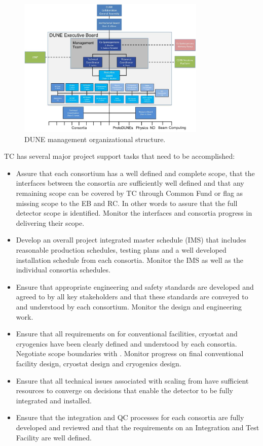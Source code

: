 \begin{figure}[htb]
  \begin{center}
    \includegraphics[width=0.8\textwidth]{far-detector-generic/figures/DUNE_mgmt}
    \caption{DUNE management organizational structure.}
    \label{fig:DUNE_org}
  \end{center}
\end{figure}



TC has several major project support tasks that need to be accomplished:
\begin{itemize}
  \item Assure that each consortium has a well defined and complete
    scope, that the interfaces between the consortia are sufficiently
    well defined and that any remaining scope can be covered by TC
    through Common Fund or flag as missing scope to the EB and RC. In
    other words to assure that the full detector scope is
    identified. Monitor the interfaces and consortia progress in
    delivering their scope.
  \item Develop an overall project integrated master schedule (IMS)
    that includes reasonable production schedules, testing plans and a
    well developed installation schedule from each consortia. Monitor
    the IMS as well as the individual consortia schedules.
  \item Ensure that appropriate engineering and safety standards are
    developed and agreed to by all key stakeholders and that these
    standards are conveyed to and understood by each
    consortium. Monitor the design and engineering work.
  \item Ensure that all  requirements on  for
    conventional facilities, cryostat and cryogenics have been clearly
    defined and understood by each consortia. Negotiate scope
    boundaries with . Monitor  progress on
    final conventional facility design, cryostat design and cryogenics
    design.
  \item Ensure that all technical issues associated with scaling from
     have sufficient resources to converge on
    decisions that enable the detector to be fully integrated and
    installed.
  \item Ensure that the integration and QC processes for each
    consortia are fully developed and reviewed and that the
    requirements on an Integration and Test Facility are well defined.
\end{itemize}

